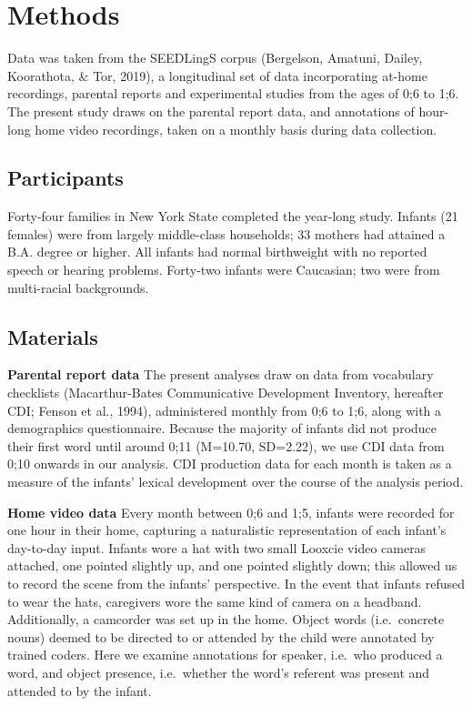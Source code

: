 \documentclass[
  english,
  man,floatsintext]{apa6}
\begin{document}
\hypertarget{methods}{%
\section{Methods}\label{methods}}

Data was taken from the SEEDLingS corpus (Bergelson, Amatuni, Dailey, Koorathota, \& Tor, 2019), a longitudinal set of data incorporating at-home recordings, parental reports and experimental studies from the ages of 0;6 to 1;6. The present study draws on the parental report data, and annotations of hour-long home video recordings, taken on a monthly basis during data collection.

\hypertarget{participants}{%
\subsection{Participants}\label{participants}}

Forty-four families in New York State completed the year-long study. Infants (21 females) were from largely middle-class households; 33 mothers had attained a B.A. degree or higher. All infants had normal birthweight with no reported speech or hearing problems. Forty-two infants were Caucasian; two were from multi-racial backgrounds.

\hypertarget{materials}{%
\subsection{Materials}\label{materials}}

\textbf{Parental report data} The present analyses draw on data from vocabulary checklists (Macarthur-Bates Communicative Development Inventory, hereafter CDI; Fenson et al., 1994), administered monthly from 0;6 to 1;6, along with a demographics questionnaire. Because the majority of infants did not produce their first word until around 0;11 (M=10.70, SD=2.22), we use CDI data from 0;10 onwards in our analysis. CDI production data for each month is taken as a measure of the infants' lexical development over the course of the analysis period.

\textbf{Home video data} Every month between 0;6 and 1;5, infants were recorded for one hour in their home, capturing a naturalistic representation of each infant's day-to-day input. Infants wore a hat with two small Looxcie video cameras attached, one pointed slightly up, and one pointed slightly down; this allowed us to record the scene from the infants' perspective. In the event that infants refused to wear the hats, caregivers wore the same kind of camera on a headband. Additionally, a camcorder was set up in the home. Object words (i.e.~concrete nouns) deemed to be directed to or attended by the child were annotated by trained coders. Here we examine annotations for speaker, i.e.~who produced a word, and object presence, i.e.~whether the word's referent was present and attended to by the infant.
\end{document}
